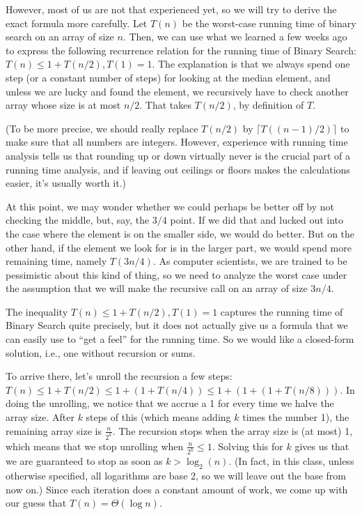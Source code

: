 However, most of us are not that experienced yet, so we will try to
derive the exact formula more carefully. 
Let $T(n)$ be the worst-case running time of binary search on an array
of size $n$. 
Then, we can use what we learned a few weeks ago to express the
following recurrence relation for the running time of Binary Search: 
$T(n) \leq 1 + T(n/2), T(1) = 1$.
The explanation is that we always spend one step (or a constant number
of steps) for looking at the median element, and unless we are lucky
and found the element, we recursively have to check another array
whose size is at most $n/2$. That takes $T(n/2)$, by definition of $T$.

(To be more precise, we should really replace $T(n/2)$ by 
$\lceil T((n-1)/2) \rceil$ to make sure that all numbers are integers.
However, experience with running time analysis tells us that rounding
up or down virtually never is the crucial part of a running time
analysis, and if leaving out ceilings or floors makes the calculations
easier, it's usually worth it.)

At this point, we may wonder whether we could perhaps be better off by
not checking the middle, but, say, the $3/4$ point.
If we did that and lucked out into the case where the element is on
the smaller side, we would do better. But on the other hand, if the
element we look for is in the larger part, we would spend more
remaining time, namely $T(3n/4)$. As computer scientists, we are
trained to be pessimistic about this kind of thing, so we need to
analyze the worst case under the assumption that we will make the
recursive call on an array of size $3n/4$.

The inequality $T(n) \leq 1 + T(n/2), T(1) = 1$ captures the running
time of Binary Search quite precisely, but it does not actually give
us a formula that we can easily use to ``get a feel'' for the running
time. So we would like a closed-form solution, i.e., one without
recursion or sums. 

To arrive there, let's unroll the recursion a few steps:
$T(n) \leq 1 + T(n/2) \leq 1 + (1 + T(n/4)) \leq 1 + (1 + (1 + T(n/8)))$.
In doing the unrolling, we notice that we accrue a 1 for every time we
halve the array size.
After $k$ steps of this (which means adding $k$ times the number 1), 
the remaining array size is $\frac{n}{2^k}$.
The recursion stops when the array size is (at most) 1, which means
that we stop unrolling when $\frac{n}{2^k} \leq 1$.
Solving this for $k$ gives us that we are guaranteed to stop as soon
as $k > \log_2(n)$. (In fact, in this class, unless otherwise
specified, all logarithms are base 2, so we will leave out the base
from now on.)
Since each iteration does a constant amount of work, we come up with
our guess that $T(n) = \Theta(\log n)$. 

